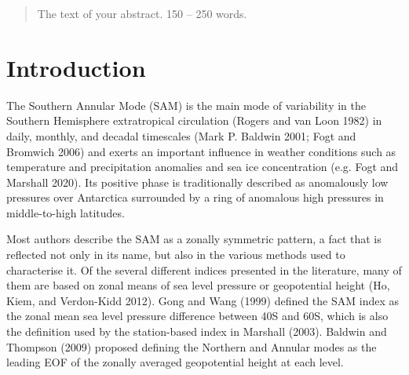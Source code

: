 \documentclass[smallextended]{svjour3}       %
\begin{document}
\date{Received: date / Accepted: date}


\maketitle

\begin{abstract}
The text of your abstract. 150 -- 250 words.
\\


\end{abstract}


\def\spacingset#1{\renewcommand{\baselinestretch}%
{#1}\small\normalsize} \spacingset{1}


\hypertarget{introduction}{%
\section{Introduction}\label{introduction}}

The Southern Annular Mode (SAM) is the main mode of variability in the Southern Hemisphere extratropical circulation (Rogers and van Loon 1982) in daily, monthly, and decadal timescales (Mark P. Baldwin 2001; Fogt and Bromwich 2006) and exerts an important influence in weather conditions such as temperature and precipitation anomalies and sea ice concentration (e.g. Fogt and Marshall 2020). Its positive phase is traditionally described as anomalously low pressures over Antarctica surrounded by a ring of anomalous high pressures in middle-to-high latitudes.

Most authors describe the SAM as a zonally symmetric pattern, a fact that is reflected not only in its name, but also in the various methods used to characterise it. Of the several different indices presented in the literature, many of them are based on zonal means of sea level pressure or geopotential height (Ho, Kiem, and Verdon-Kidd 2012). Gong and Wang (1999) defined the SAM index as the zonal mean sea level pressure difference between 40\degree S and 60\degree S, which is also the definition used by the station-based index in Marshall (2003). Baldwin and Thompson (2009) proposed defining the Northern and Annular modes as the leading EOF of the zonally averaged geopotential height at each level.
\end{document}
